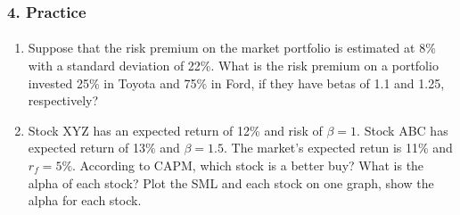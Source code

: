 \documentclass{beamer}
\begin{document}
\begin{practiceframe}[t]
    \frametitle{4. Practice}
    \framesubtitle{}

    \begin{enumerate}
        \item Suppose that the risk premium on the market portfolio is estimated at 8\% with 
        a standard deviation of 22\%.   What is the risk premium on a portfolio invested 25\% 
        in Toyota and 75\% in Ford, if they have betas of 1.1 and 1.25, respectively?
        \item Stock XYZ has an expected return of 12\% and risk of $\beta=1$.   Stock ABC 
        has expected return of 13\% and $\beta=1.5$.   The market's expected retun is 11\% 
        and $r_f=5\%$.   According to CAPM, which stock is a better buy?   What is the alpha 
        of each stock?   Plot the SML and each stock on one graph, show the alpha for each 
        stock.
    \end{enumerate}

\end{practiceframe}
\end{document}
